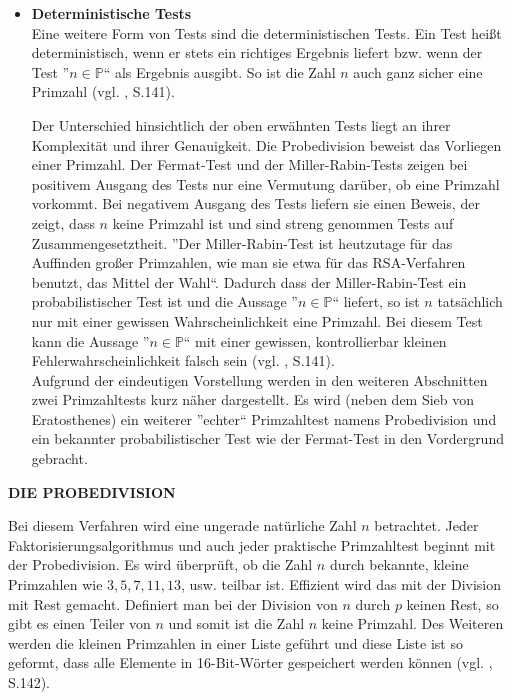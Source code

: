 \begin{itemize}
 \item \textbf{Deterministische Tests}\\
    Eine weitere Form von Tests sind die deterministischen
    Tests. Ein Test heißt deterministisch, wenn er stets ein
    richtiges Ergebnis liefert bzw. wenn der Test
    ''$n \in\mathbb{P}$`` als Ergebnis ausgibt. So ist die
    Zahl $n$ auch ganz sicher eine Primzahl
    (vgl. \cite{karpfingerkiechle}, S.141).
    
    Der Unterschied hinsichtlich der oben erwähnten Tests
    liegt an ihrer Komplexität und ihrer Genauigkeit.
    Die Probedivision beweist das Vorliegen einer Primzahl.
    Der Fermat-Test und der Miller-Rabin-Tests zeigen bei
    positivem Ausgang des Tests nur eine Vermutung darüber,
    ob eine Primzahl vorkommt. Bei negativem Ausgang des
    Tests liefern sie einen Beweis, der zeigt, dass $n$
    keine Primzahl ist und sind streng genommen Tests auf
    Zusammengesetztheit. ''Der Miller-Rabin-Test ist
    heutzutage für das Auffinden großer Primzahlen, wie man
    sie etwa für das RSA-Verfahren benutzt, das Mittel der 
    Wahl``. Dadurch dass der Miller-Rabin-Test ein
    probabilistischer Test ist und die Aussage
    ''$n \in\mathbb{P}$`` liefert, so ist $n$ tatsächlich
    nur mit einer gewissen Wahrscheinlichkeit eine Primzahl.
    Bei diesem Test kann die Aussage ''$n \in\mathbb{P}$``
    mit einer gewissen, kontrollierbar kleinen
    Fehlerwahrscheinlichkeit falsch sein
    (vgl. \cite{karpfingerkiechle}, S.141).\\
    Aufgrund der eindeutigen Vorstellung werden in den
    weiteren Abschnitten zwei Primzahltests kurz näher
    dargestellt. Es wird (neben dem Sieb von Eratosthenes)
    ein weiterer ''echter`` Primzahltest namens
    Probedivision und ein bekannter probabilistischer Test
    wie der Fermat-Test in den Vordergrund gebracht.\\
\end{itemize}


\textbf{DIE PROBEDIVISION}

Bei diesem Verfahren wird eine ungerade natürliche Zahl
$n$ betrachtet. Jeder Faktorisierungsalgorithmus und auch
jeder praktische Primzahltest beginnt mit der Probedivision.
Es wird überprüft, ob die Zahl $n$ durch bekannte, kleine
Primzahlen wie $3, 5, 7, 11, 13$, usw. teilbar ist.
Effizient wird das mit der Division mit Rest gemacht.
Definiert man bei der Division von $n$ durch $p$ keinen Rest,
so gibt es einen Teiler von $n$ und somit ist die Zahl $n$
keine Primzahl. Des Weiteren werden die kleinen Primzahlen
in einer Liste geführt und diese Liste ist so geformt,
dass alle Elemente in 16-Bit-Wörter gespeichert werden können
(vgl. \cite{karpfingerkiechle}, S.142).

